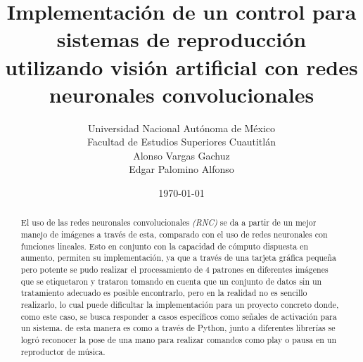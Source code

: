 \documentclass[a4paper, 12pt]{article}
\title{
    Implementación de un control para sistemas de reproducción utilizando visión artificial con redes neuronales convolucionales
}
\author{		
    Universidad Nacional Autónoma de México\\
    Facultad de Estudios Superiores Cuautitlán\\
    Alonso Vargas Gachuz\\
    Edgar Palomino Alfonso
}
\date{\today}
\begin{document}
 
    \maketitle  

    \begin{abstract}  
        El uso de las redes neuronales convolucionales \emph{(RNC)} se da a partir de un mejor manejo de imágenes a través de esta, comparado con el uso de redes neuronales con funciones lineales. Esto en conjunto con la capacidad de cómputo dispuesta en aumento, permiten su implementación, ya que a través de una tarjeta gráfica pequeña pero potente se pudo realizar el procesamiento de 4 patrones en diferentes imágenes que se etiquetaron y trataron tomando en cuenta que un conjunto de datos sin un tratamiento adecuado es posible encontrarlo, pero en la realidad no es sencillo realizarlo, lo cual puede dificultar la implementación para un proyecto concreto donde, como este caso, se busca responder a casos específicos como señales de activación para un sistema. de esta manera es como a través de Python, junto a diferentes librerías se logró reconocer la pose de una mano para realizar comandos como play o pausa en un reproductor de música. 
    \end{abstract}  

    \vspace{2ex} 
\end{document}
